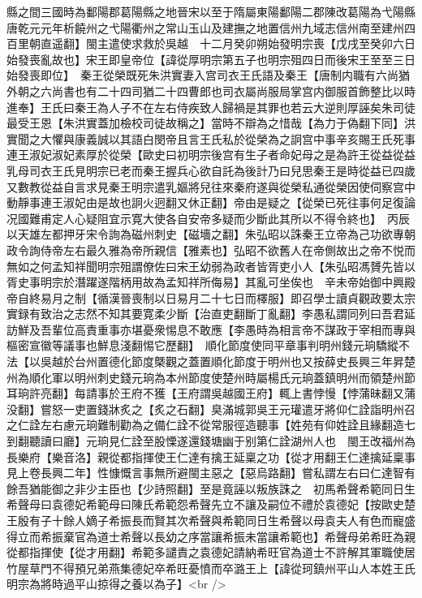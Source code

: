 縣之間三國時為鄱陽郡葛陽縣之地晉宋以至于隋屬東陽鄱陽二郡陳改葛陽為弋陽縣唐乾元元年析饒州之弋陽衢州之常山玉山及建撫之地置信州九域志信州南至建州四百里朝直遥翻】閩主遣使求救於吳越　十二月癸卯朔始發明宗喪【戊戌至癸卯六日始發喪亂故也】宋王即皇帝位【諱從厚明宗第五子也明宗殂四日而後宋王至至三日始發喪即位】　秦王從榮既死朱洪實妻入宫司衣王氏語及秦王【唐制内職有六尚猶外朝之六尚書也有二十四司猶二十四曹郎也司衣屬尚服局掌宫内御服首飾整比以時進奉】王氏曰秦王為人子不在左右侍疾致人歸禍是其罪也若云大逆則厚誣矣朱司徒最受王恩【朱洪實蓋加檢校司徒故稱之】當時不辯為之惜哉【為力于偽翻下同】洪實聞之大懼與康義誠以其語白閔帝且言王氏私於從榮為之詗宫中事辛亥賜王氏死事連王淑妃淑妃素厚於從榮【歐史曰初明宗後宫有生子者命妃母之是為許王從益從益乳母司衣王氏見明宗已老而秦王握兵心欲自託為後計乃曰兒思秦王是時從益已四歲又數教從益自言求見秦王明宗遣乳嫗將兒往來秦府遂與從榮私通從榮因使伺察宫中動靜事連王淑妃由是故也詗火迥翻又休正翻】帝由是疑之【從榮已死往事何足復論况國難甫定人心疑阻宜示寛大使各自安帝多疑而少斷此其所以不得令終也】　丙辰以天雄左都押牙宋令詢為磁州刺史【磁墻之翻】朱弘昭以誅秦王立帝為己功欲專朝政令詢侍帝左右最久雅為帝所親信【雅素也】弘昭不欲舊人在帝側故出之帝不悦而無如之何孟知祥聞明宗殂謂僚佐曰宋王幼弱為政者皆胥吏小人【朱弘昭馮贇先皆以胥史事明宗於潛躍遂階柄用故為孟知祥所侮易】其亂可坐俟也　辛未帝始御中興殿帝自終易月之制【循漢晉喪制以日易月二十七日而檡服】即召學士讀貞觀政要太宗實録有致治之志然不知其要寛柔少斷【治直吏翻斷丁亂翻】李愚私謂同列曰吾君延訪鮮及吾輩位高責重事亦堪憂衆惕息不敢應【李愚時為相言帝不謀政于宰相而專與樞密宣徽等議事也鮮息淺翻惕它歷翻】　順化節度使同平章事判明州錢元珦驕縱不法【以吳越於台州置德化節度槩觀之蓋置順化節度于明州也又按薛史長興三年昇楚州為順化軍以明州刺史錢元珦為本州節度使楚州時屬楊氏元珦蓋鎮明州而領楚州節耳珦許亮翻】每請事於王府不獲【王府謂吳越國王府】輒上書悖慢【悖蒲昧翻又蒲没翻】嘗怒一吏置錢牀炙之【炙之石翻】臭滿城郭吳王元瓘遣牙將仰仁詮詣明州召之仁詮左右慮元珦難制勸為之備仁詮不從常服徑造聽事【姓苑有仰姓詮且緣翻造七到翻聽讀曰廳】元珦見仁詮至股慄遂還錢塘幽于别第仁詮湖州人也　閩王改福州為長樂府【樂音洛】親從都指揮使王仁達有擒王延稟之功【從才用翻王仁達擒延稟事見上卷長興二年】性慷慨言事無所避閩主惡之【惡烏路翻】嘗私謂左右曰仁達智有餘吾猶能御之非少主臣也【少詩照翻】至是竟誣以叛族誅之　初馬希聲希範同日生希聲母曰袁德妃希範母曰陳氏希範怨希聲先立不讓及嗣位不禮於袁德妃【按歐史楚王殷有子十餘人嫡子希振長而賢其次希聲與希範同日生希聲以母袁夫人有色而寵盛得立而希振棄官為道士希聲以長幼之序當讓希振未當讓希範也】希聲母弟希旺為親從都指揮使【從才用翻】希範多譴責之袁德妃請納希旺官為道士不許解其軍職使居竹屋草門不得預兄弟燕集德妃卒希旺憂憤而卒潞王上【諱從珂鎮州平山人本姓王氏明宗為將時過平山掠得之養以為子】<br />
